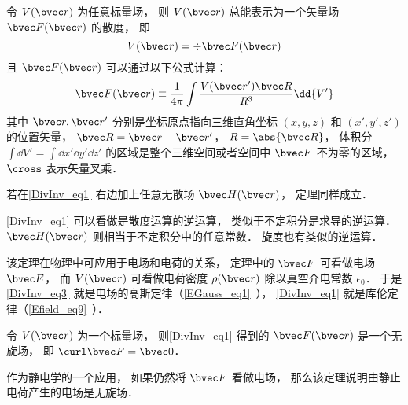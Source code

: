 

\begin{theorem}{}
令 $V(\bvec r)$ 为任意标量场， 则 $V(\bvec r)$ 总能表示为一个矢量场 $\bvec F(\bvec r)$ 的散度， 即
\begin{equation}\label{DivInv_eq3}
V(\bvec r) = \div \bvec F(\bvec r)
\end{equation}
且 $\bvec F(\bvec r)$ 可以通过以下公式计算：
\begin{equation}\label{DivInv_eq1}
\bvec F(\bvec r) \equiv \frac{1}{4\pi}\int \frac{V(\bvec r') \bvec R}{R^3} \dd{V'}
\end{equation}
其中 $\bvec r, \bvec r'$ 分别是坐标原点指向三维直角坐标 $(x, y, z)$ 和 $(x', y', z')$ 的位置矢量， $\bvec R = \bvec r - \bvec r'$， $R = \abs{\bvec R}$， 体积分 $\int\dd{V'} = \int\dd{x'}\dd{y'}\dd{z'}$ 的区域是整个三维空间或者空间中 $\bvec F$ 不为零的区域， $\cross$ 表示矢量叉乘．

若在\autoref{DivInv_eq1} 右边加上任意无散场 $\bvec H(\bvec r)$， 定理同样成立．
\end{theorem}

\autoref{DivInv_eq1} 可以看做是散度运算的逆运算， 类似于不定积分是求导的逆运算． $\bvec H(\bvec r)$ 则相当于不定积分中的任意常数． 旋度也有类似的逆运算．

该定理在物理中可应用于电场和电荷的关系， 定理中的 $\bvec F$ 可看做电场 $\bvec E$， 而 $V(\bvec r)$ 可看做电荷密度 $\rho(\bvec r)$ 除以真空介电常数 $\epsilon_0$． 于是\autoref{DivInv_eq3} 就是电场的高斯定律（\autoref{EGauss_eq1}~）， \autoref{DivInv_eq1} 就是库伦定律（\autoref{Efield_eq9}~）．

\begin{theorem}{}\label{DivInv_the1}
令 $V(\bvec r)$ 为一个标量场， 则\autoref{DivInv_eq1} 得到的 $\bvec F(\bvec r)$ 是一个无旋场， 即 $\curl \bvec F = \bvec 0$．
\end{theorem}

作为静电学的一个应用， 如果仍然将 $\bvec F$ 看做电场， 那么该定理说明由静止电荷产生的电场是无旋场．

